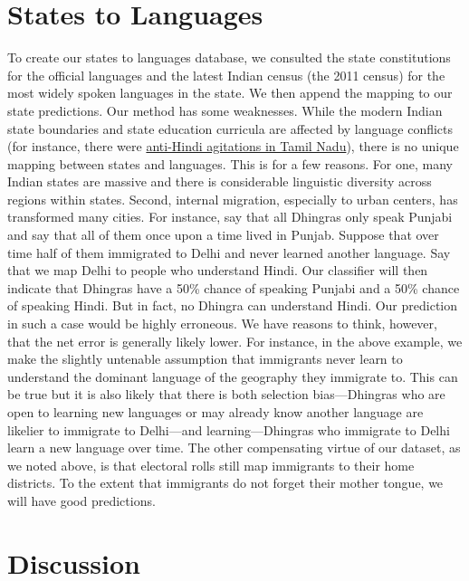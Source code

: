 \documentclass[11pt,  letterpaper]{article}
\begin{document}
\section{States to Languages}

To create our states to languages database, we consulted the state constitutions for the official languages and the latest Indian census (the 2011 census) for the most widely spoken languages in the state. We then append the mapping to our state predictions. Our method has some weaknesses. While the modern Indian state boundaries and state education curricula are affected by language conflicts (for instance, there were \href{https://en.wikipedia.org/wiki/Anti-Hindi_agitations_of_Tamil_Nadu}{anti-Hindi agitations in Tamil Nadu}), there is no unique mapping between states and languages. This is for a few reasons. For one, many Indian states are massive and there is considerable linguistic diversity across regions within states. Second, internal migration, especially to urban centers, has transformed many cities. For instance, say that all Dhingras only speak Punjabi and say that all of them once upon a time lived in Punjab. Suppose that over time half of them immigrated to Delhi and never learned another language. Say that we map Delhi to people who understand Hindi. Our classifier will then indicate that Dhingras have a 50\% chance of speaking Punjabi and a 50\% chance of speaking Hindi. But in fact, no Dhingra can understand Hindi. Our prediction in such a case would be highly erroneous. We have reasons to think, however, that the net error is generally likely lower. For instance, in the above example, we make the slightly untenable assumption that immigrants never learn to understand the dominant language of the geography they immigrate to. This can be true but it is also likely that there is both selection bias—Dhingras who are open to learning new languages or may already know another language are likelier to immigrate to Delhi—and learning—Dhingras who immigrate to Delhi learn a new language over time. The other compensating virtue of our dataset, as we noted above, is that electoral rolls still map immigrants to their home districts. To the extent that immigrants do not forget their mother tongue, we will have good predictions. 

\section{Discussion}
\end{document}
